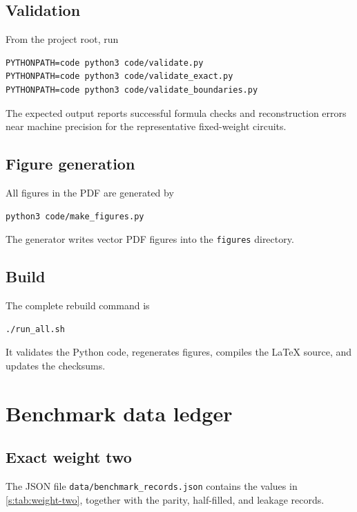 \subsection{Validation}
From the project root, run
\begin{lstlisting}[style=pythonstyle]
PYTHONPATH=code python3 code/validate.py
PYTHONPATH=code python3 code/validate_exact.py
PYTHONPATH=code python3 code/validate_boundaries.py
\end{lstlisting}
The expected output reports successful formula checks and reconstruction errors near machine precision for the representative fixed-weight circuits.

\subsection{Figure generation}
All figures in the PDF are generated by
\begin{lstlisting}[style=pythonstyle]
python3 code/make_figures.py
\end{lstlisting}
The generator writes vector PDF figures into the \texttt{figures} directory.

\subsection{Build}
The complete rebuild command is
\begin{lstlisting}[style=pythonstyle]
./run_all.sh
\end{lstlisting}
It validates the Python code, regenerates figures, compiles the LaTeX source, and updates the checksums.

\section{Benchmark data ledger}
\label{s:app:benchmark-ledger}

\subsection{Exact weight two}
The JSON file \texttt{data/benchmark\_records.json} contains the values in \cref{s:tab:weight-two}, together with the parity, half-filled, and leakage records.

